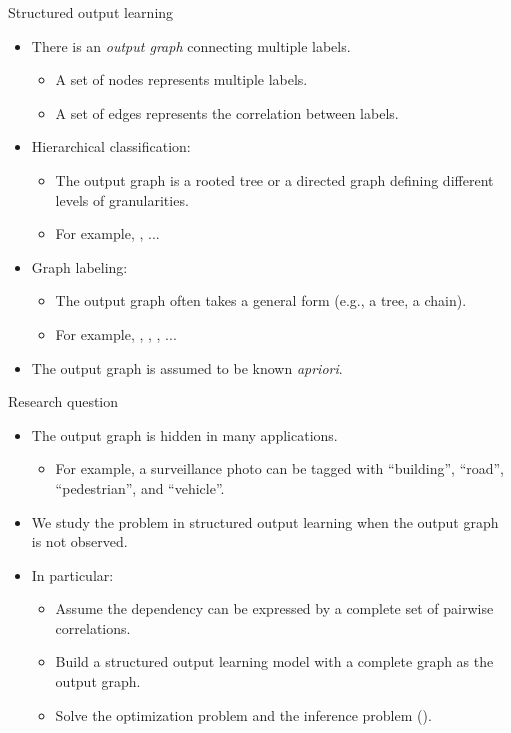 \documentclass[first=dgreen,second=purple,logo=yellowexc]{aaltoslides}
\begin{document}
%
\begin{frame}{Structured output learning}
	\begin{itemize}\footnotesize
		\item There is an \textit{output graph} connecting multiple labels.
		\begin{itemize}\footnotesize
			\item A set of nodes represents multiple labels.
			\item A set of edges represents the correlation between labels.
		\end{itemize}
		\item Hierarchical classification:
		\begin{itemize}\footnotesize
			\item The output graph is a rooted tree or a directed graph defining different levels of granularities.
			\item For example, \svmstruct, ...
		\end{itemize}
		\item Graph labeling:
		\begin{itemize}\footnotesize
			\item The output graph often takes a general form (e.g., a tree, a chain).
			\item For example, \mmmn, \crf, \mmcrf, ...
		\end{itemize}
		\item The output graph is assumed to be known \textit{apriori}.
	\end{itemize}
\end{frame}



%
\begin{frame}{Research question}
	\begin{itemize}\footnotesize
		\item The output graph is hidden in many applications.
		\begin{itemize}\footnotesize
			\item For example, a surveillance photo can be tagged with ``building'', ``road'', ``pedestrian'', and ``vehicle''.
		\end{itemize}
		\item We study the problem in structured output learning when the output graph is not observed.
		\item In particular:
		\begin{itemize}\footnotesize
			\item Assume the dependency can be expressed by a complete set of pairwise correlations.
			\item Build a structured output learning model with a complete graph as the output graph.
			\item Solve the optimization problem and the inference problem (\nphard).
		\end{itemize}
	\end{itemize}
\end{frame}
\end{document}

